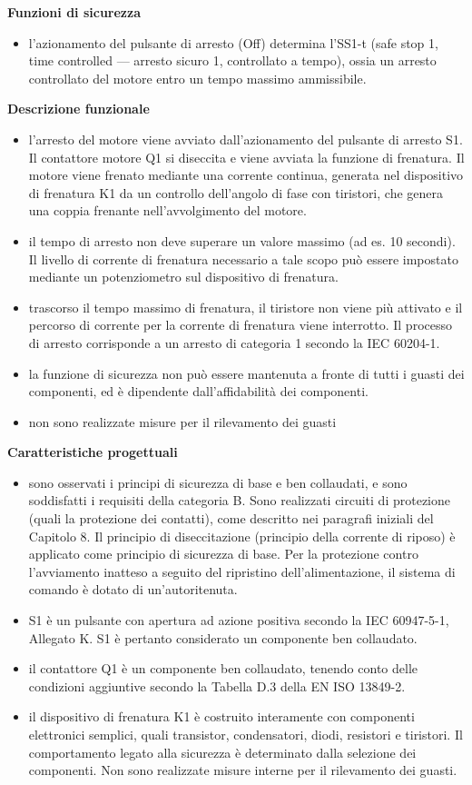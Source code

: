 \textbf{Funzioni di sicurezza}
\begin{itemize}
    \item l'azionamento del pulsante di arresto (Off) determina l'SS1-t (safe stop 1, time controlled — arresto sicuro 1, controllato a tempo), ossia un arresto controllato del motore entro un tempo massimo ammissibile.
\end{itemize}

\textbf{Descrizione funzionale}
\begin{itemize}
    \item l'arresto del motore viene avviato dall'azionamento del pulsante di arresto S1. Il contattore motore Q1 si diseccita e viene avviata la funzione di frenatura. Il motore viene frenato mediante una corrente continua, generata nel dispositivo di frenatura K1 da un controllo dell'angolo di fase con tiristori, che genera una coppia frenante nell'avvolgimento del motore.
    \item il tempo di arresto non deve superare un valore massimo (ad es. 10 secondi). Il livello di corrente di frenatura necessario a tale scopo può essere impostato mediante un potenziometro sul dispositivo di frenatura.
    \item trascorso il tempo massimo di frenatura, il tiristore non viene più attivato e il percorso di corrente per la corrente di frenatura viene interrotto. Il processo di arresto corrisponde a un arresto di categoria 1 secondo la IEC 60204-1.
    \item la funzione di sicurezza non può essere mantenuta a fronte di tutti i guasti dei componenti, ed è dipendente dall'affidabilità dei componenti.
    \item non sono realizzate misure per il rilevamento dei guasti
\end{itemize}

\textbf{Caratteristiche progettuali}
\begin{itemize}
    \item sono osservati i principi di sicurezza di base e ben collaudati, e sono soddisfatti i requisiti della categoria B. Sono realizzati circuiti di protezione (quali la protezione dei contatti), come descritto nei paragrafi iniziali del Capitolo 8. Il principio di diseccitazione (principio della corrente di riposo) è applicato come principio di sicurezza di base. Per la protezione contro l'avviamento inatteso a seguito del ripristino dell'alimentazione, il sistema di comando è dotato di un'autoritenuta.
    \item S1 è un pulsante con apertura ad azione positiva secondo la IEC 60947-5-1, Allegato K. S1 è pertanto considerato un componente ben collaudato.
    \item il contattore Q1 è un componente ben collaudato, tenendo conto delle condizioni aggiuntive secondo la Tabella D.3 della EN ISO 13849-2.
    \item il dispositivo di frenatura K1 è costruito interamente con componenti elettronici semplici, quali transistor, condensatori, diodi, resistori e tiristori. Il comportamento legato alla sicurezza è determinato dalla selezione dei componenti. Non sono realizzate misure interne per il rilevamento dei guasti.
\end{itemize}

